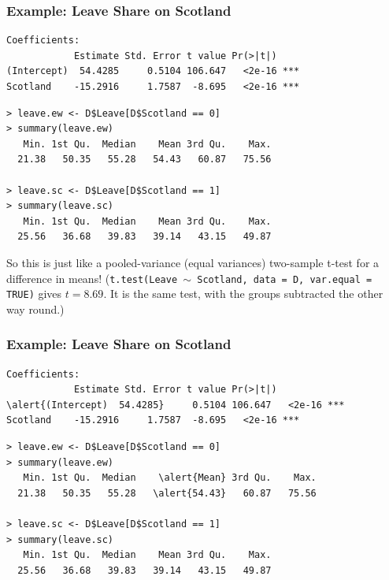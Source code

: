 \documentclass[xcolor=svgnames,9pt,english,aspectratio=169,t]{beamer}
\begin{document}
\begin{frame}[fragile]
\frametitle{Example: Leave Share on Scotland}

\begin{Verbatim}[fontsize=\footnotesize, frame=single, label=R Code, commandchars=\\\{\}]
Coefficients:
            Estimate Std. Error t value Pr(>|t|)
(Intercept)  54.4285     0.5104 106.647   <2e-16 ***
Scotland    -15.2916     1.7587  -8.695   <2e-16 ***
\end{Verbatim}

\bigskip

\begin{Verbatim}[fontsize=\footnotesize, frame=single, label=R Code, commandchars=\\\{\}]
> leave.ew <- D$Leave[D$Scotland == 0]
> summary(leave.ew)
   Min. 1st Qu.  Median    Mean 3rd Qu.    Max.
  21.38   50.35   55.28   54.43   60.87   75.56

> leave.sc <- D$Leave[D$Scotland == 1]
> summary(leave.sc)
   Min. 1st Qu.  Median    Mean 3rd Qu.    Max.
  25.56   36.68   39.83   39.14   43.15   49.87
\end{Verbatim}
So this is just like a pooled-variance (equal variances) two-sample t-test for a difference in means!
{\small (\texttt{t.test(Leave $\sim$ Scotland, data = D, var.equal = TRUE)} gives $t = 8.69$. It is the same test, with the groups subtracted the other way round.)}

\end{frame}

\begin{frame}[fragile]
\frametitle{Example: Leave Share on Scotland}

\begin{Verbatim}[fontsize=\footnotesize, frame=single, label=R Code, commandchars=\\\{\}]
Coefficients:
            Estimate Std. Error t value Pr(>|t|)
\alert{(Intercept)  54.4285}     0.5104 106.647   <2e-16 ***
Scotland    -15.2916     1.7587  -8.695   <2e-16 ***
\end{Verbatim}

\bigskip

\begin{Verbatim}[fontsize=\footnotesize, frame=single, label=R Code, commandchars=\\\{\}]
> leave.ew <- D$Leave[D$Scotland == 0]
> summary(leave.ew)
   Min. 1st Qu.  Median    \alert{Mean} 3rd Qu.    Max.
  21.38   50.35   55.28   \alert{54.43}   60.87   75.56

> leave.sc <- D$Leave[D$Scotland == 1]
> summary(leave.sc)
   Min. 1st Qu.  Median    Mean 3rd Qu.    Max.
  25.56   36.68   39.83   39.14   43.15   49.87
\end{Verbatim}
\end{frame}
\end{document}

